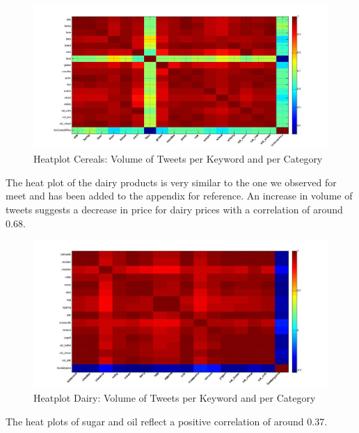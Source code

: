 \begin{figure}[H]
        \centering
         \includegraphics[width=1\textwidth ]{img/anal/cereals_heatplot}
              
        \caption{Heatplot Cereals: Volume of Tweets per Keyword and per Category}
        \label{fig:distribution}
\end{figure}
 
 
 
The heat plot of the dairy products is very similar to the one we observed for meet and has been added to the appendix for reference. An increase in volume of tweets suggests a decrease in price for dairy prices with a correlation of around 0.68. 

\begin{figure}[H]
        \centering
         \includegraphics[width=1\textwidth ]{img/anal/dairy_heatplot}
              
        \caption{Heatplot Dairy: Volume of Tweets per Keyword and per Category}
        \label{fig:distribution}
\end{figure}
 
The heat plots of sugar and oil reflect a positive correlation of around 0.37. 

